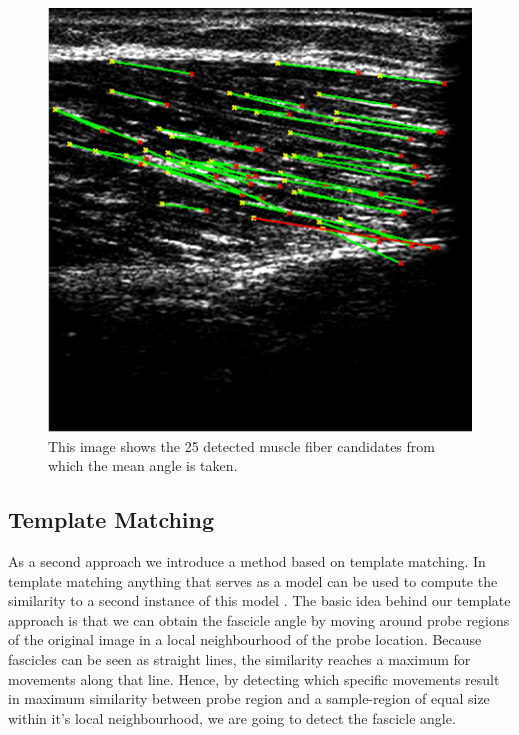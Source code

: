 \documentclass[10pt,twocolumn,letterpaper]{article}
\begin{document}
\begin{figure}
	\begin{center}		
		\includegraphics[width=1\linewidth]{img/im1_hough_fibers}
	\end{center}
	\caption{This image shows the 25 detected muscle fiber candidates from which the mean angle is taken.}
	\label{fig:im1_hough_fibers}
	
\end{figure}

\subsection{Template Matching}
As a second approach we introduce a method based on template matching. In template matching anything that serves as a model can be used to compute the similarity to a second instance of this model \cite{Brunelli09a}. The basic idea behind our template approach is that we can obtain the fascicle angle by moving around probe regions of the original image in a local neighbourhood of the probe location. Because fascicles can be seen as straight lines, the similarity reaches a maximum for movements along that line. Hence, by detecting which specific movements result in maximum similarity between probe region and a sample-region of equal size within it's local neighbourhood, we are going to detect the fascicle angle.
\end{document}
